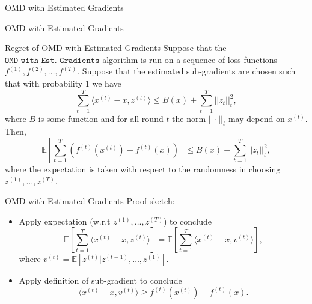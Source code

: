 \begin{frame}{OMD with Estimated Gradients}
    \small
    \begin{center}
    \end{center}
\end{frame}

\begin{frame}{OMD with Estimated Gradients}
    \small
    \begin{block}{Regret of OMD with Estimated Gradients}
        Suppose that the $\texttt{OMD with Est. Gradients}$ algorithm is run on a sequence of loss functions $f^{(1)}, f^{(2)}, \dots, f^{(T)}$. Suppose that the estimated sub-gradients are chosen such that with probability 1 we have
        $$ \sum_{t=1}^T \langle x^{(t)} - x, z^{(t)} \rangle \leq B(x) + \sum_{t=1}^{T} ||z_t||^2_t,$$
        where $B$ is some function and for all round $t$ the norm $||\cdot||_t$ may depend on $x^{(t)}$. Then,
        $$ \mathbb{E}\left[ \sum_{t=1}^{T} \left( f^{(t)}(x^{(t)}) - f^{(t)}(x) \right) \right] \leq B(x) + \sum_{t=1}^{T} ||z_t||^2_t, $$
        where the expectation is taken with respect to the randomness in choosing $z^{(1)}, \dots, z^{(T)}$.
    \end{block}
\end{frame}

\begin{frame}{OMD with Estimated Gradients}
    Proof sketch:
    \begin{itemize}
        \item Apply expectation (w.r.t $z^{(1)}, \dots, z^{(T)}$) to conclude 
        $$ \mathbb{E}\left[\sum_{t=1}^T \langle x^{(t)} - x, z^{(t)} \rangle\right] = \mathbb{E}\left[\sum_{t=1}^T \langle x^{(t)} - x, v^{(t)} \rangle\right], $$
        where $v^{(t)} = \mathbb{E}\left[z^{(t)}|z^{(t-1)}, \dots, z^{(1)}\right]$.
        \item Apply definition of sub-gradient to conclude 
        $$ \langle x^{(t)} - x, v^{(t)} \rangle \geq f^{(t)}(x^{(t)}) - f^{(t)}(x). $$
    \end{itemize}
\end{frame}

